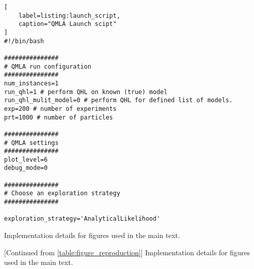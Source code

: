 \begin{lstlisting}[
    label=listing:launch_script,
    caption="QMLA Launch scipt"
]
#!/bin/bash

###############
# QMLA run configuration
###############
num_instances=1
run_qhl=1 # perform QHL on known (true) model
run_qhl_mulit_model=0 # perform QHL for defined list of models.
exp=200 # number of experiments
prt=1000 # number of particles

###############
# QMLA settings
###############
plot_level=6
debug_mode=0

###############
# Choose an exploration strategy 
###############

exploration_strategy='AnalyticalLikelihood'

\end{lstlisting}


\renewcommand{\arraystretch}{1.25} %
\setlength{\tabcolsep}{5pt}

\clearpage
\begin{table}[h!]
    \begin{center}
        
    \end{center}
    \caption[Figure implementation details]{Implementation details for figures used in the main text.}
    \label{table:figure_reproduction}
\end{table}

\clearpage
\begin{table}[h!]
        \begin{center}
            
        \end{center}
        \caption[Figure implementation details continued]{[Continued from \cref{table:figure_reproduction}] Implementation details for figures used in the main text.}
        \label{table:figure_reproduction_contd}
\end{table}
    
\clearpage